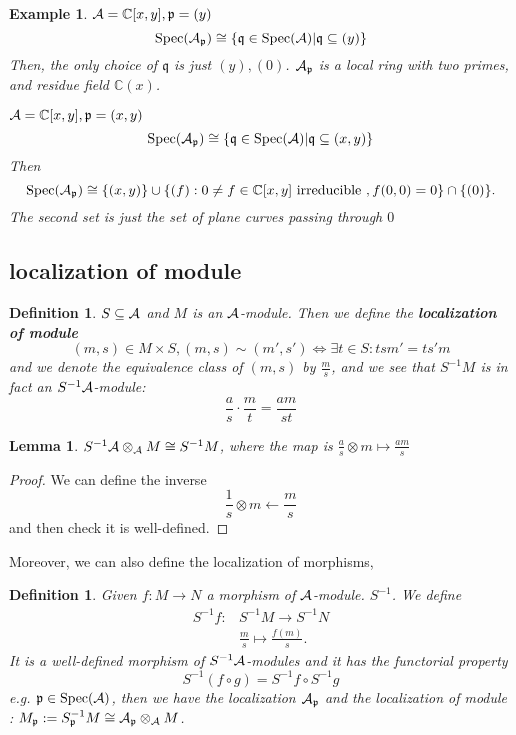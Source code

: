 \documentclass[11pt]{article}
\newtheorem{lemma}[thm]{Lemma}
\newtheorem{dfn}[thm]{Definition}
\newtheorem{ex}[thm]{Example}
\newcommand{\cplx}{\mathbb C}
\newcommand{\scp}{{\mathfrak p}}
\newcommand{\scq}{\mathfrak q}
\newcommand{\cala}{{\cal A}}
\newcommand{\lrta}{\longrightarrow}
\newcommand{\Llrta}{\Longleftrightarrow}
\begin{document}
\begin{ex}
$\cala=\cplx[x,y],\scp=(y)$\\
$$
\text{Spec}(\cala_\scp)\cong \left\{\scq\in \text{Spec}(\cala)|\scq\subseteq (y)\right\}
$$
Then, the only choice of $\scq$ is just $(y),(0)$. 
$\cala_\scp$ is a local ring with two primes, and residue field $\cplx(x)$.

$\cala=\cplx[x,y],\scp=(x,y)$\\
$$
\text{Spec}(\cala_\scp)\cong \left\{\scq\in \text{Spec}(\cala)|\scq\subseteq (x,y)\right\}
$$
Then
$$
\text{Spec}(\cala_\scp)\cong \{(x,y)\}\cup\{(f):0\neq f\in \cplx[x,y] \text{ irreducible }, f(0,0)=0\}\cap\{(0)\}.
$$
The second set is just the set of plane curves passing through $0$
\end{ex}

\subsection*{localization of module}
\begin{dfn}
$S\subseteq \cala$ and $M$ is an $\cala$-module. Then we define the \textbf{localization of module}
$$
(m,s)\in M\times S, (m,s)\sim (m',s')\Llrta \exists t\in S: tsm'=ts'm
$$
and we denote the equivalence class of $(m,s)$ by $\frac{m}{s}$, and we see that $S^{-1}M$ is in fact an $S^{-1}\cala$-module:
$$
\frac{a}{s}\cdot \frac{m}{t}=\frac{am}{st}
$$
\end{dfn}

\begin{lemma}
$S^{-1}\cala\otimes_{\cala}M\cong S^{-1}M$, where the map is $\frac{a}{s}\otimes m\mapsto \frac{am}{s}$
\end{lemma}
\begin{proof}
We can define the inverse
$$
\frac{1}{s}\otimes m \longleftarrow\frac{m}{s}
$$
and then check it is well-defined.
\end{proof}

Moreover, we can also define the localization of morphisms,
\begin{dfn}
Given $f:M\lrta N$ a morphism of $\cala$-module. $S^{-1}$. We define 
$$
\begin{aligned}
S^{-1}f:&S^{-1}M\lrta S^{-1}N\\
& \frac{m}{s}\longmapsto\frac{f(m)}{s}.
\end{aligned}
$$
It is a well-defined morphism of $S^{-1}\cala$-modules and it has the functorial property
$$
S^{-1}(f\circ g)=S^{-1}f\circ S^{-1}g
$$
e.g. 
$\scp\in \text{Spec}(\cala)$, then we have the localization $\cala_\scp$ and the localization of module : $M_\scp:=S^{-1}_\scp M\cong \cala_{\scp}\otimes_\cala M$.
\end{dfn}
\end{document}
